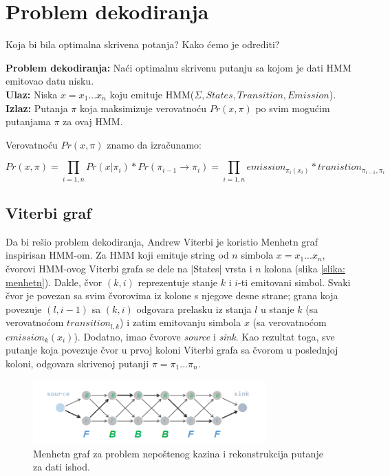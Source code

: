 \section{Problem dekodiranja}

Koja bi bila optimalna skrivena potanja? Kako ćemo je odrediti?

\begin{tcolorbox}\textbf{Problem dekodiranja:}
	Naći optimalnu skrivenu putanju sa kojom je dati HMM emitovao datu nisku.\\
	\textbf{Ulaz:} Niska $ x = x_1 . . . x_n $ koju emituje HMM($ \Sigma, States, Transition, Emission $).\\ 
	\textbf{Izlaz:} Putanja $ \pi $ koja maksimizuje verovatnoću $ Pr(x,\pi) $ po svim mogućim putanjama $ \pi $ za ovaj HMM.    
\end{tcolorbox}

Verovatnoću $ Pr(x,\pi) $ znamo da izračunamo:

$$Pr(x, \pi) = \prod_{i=1, n} Pr(x|\pi_i) * Pr(\pi_{i-1} \rightarrow \pi_i) = \prod_{i=1, n} emission_{\pi_i(x_i)} * tranistion_{\pi_{i-1}, \pi_i}$$

\subsection{Viterbi graf}


Da bi rešio problem dekodiranja, Andrew Viterbi je koristio Menhetn graf inspirisan HMM-om. Za HMM koji emituje string od $ n $ simbola $ x = x_1...x_n $, čvorovi HMM-ovog Viterbi grafa se dele na |States| vrsta i $ n $ kolona (slika \ref{slika: menhetn}). Dakle, čvor $ (k, i) $ reprezentuje stanje $ k $ i $ i $-ti emitovani simbol. Svaki čvor je povezan sa svim čvorovima iz kolone s njegove desne strane; grana koja povezuje $  (l, i-1) $ sa $ (k, i) $ odgovara prelasku iz stanja $ l $ u stanje $ k $ (sa verovatnoćom $ transition_{l, k}$) i zatim emitovanju simbola $ x $ (sa verovatnoćom $ emission_k(x_i)$). Dodatno, imao čvorove \textit{source} i \textit{sink}. Kao rezultat toga, sve putanje koja povezuje čvor u prvoj koloni Viterbi grafa sa čvorom u poslednjoj koloni, odgovara skrivenoj putanji $ \pi = \pi_1...\pi_n$.

\begin{figure}[H]
\centering
\includegraphics[width=0.8\textwidth]{poglavlja/10/slike/viterbiFB.png}
\caption{Menhetn graf za problem nepoštenog kazina i rekonstrukcija putanje za dati ishod.}
\label{slika: viterbi}
\end{figure}


